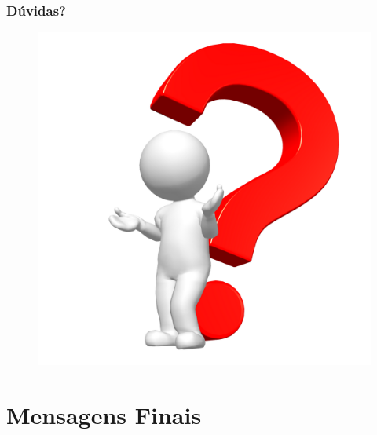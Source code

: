 \documentclass[aspectratio=169]{beamer}
\begin{document}
\begin{frame}\frametitle{Dúvidas?}
	\begin{figure}[h]
		\centering
		\includegraphics[height=0.6\paperheight]{pucrs-ec-poo-unidade_00-apresentacao_da_disciplina_e_revisao-laminas-duvidas.png}
	\end{figure}
\end{frame}

\section{Mensagens Finais}
\end{document}
